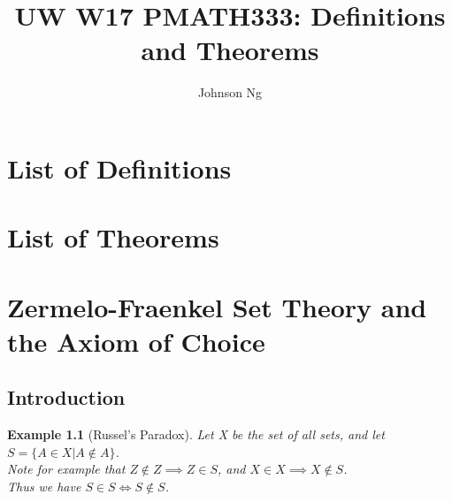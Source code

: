 \documentclass[11pt, oneside]{book}
\title{UW W17 PMATH333: Definitions and Theorems}
\author{Johnson Ng}
\theoremstyle{break}
\newtheorem{eg}{Example}[section]
\begin{document}
\maketitle
\tableofcontents

\chapter*{List of Definitions}

\chapter*{List of Theorems}

\appendix

\chapter{Zermelo-Fraenkel Set Theory and the Axiom of Choice}
\section{Introduction}
\begin{eg}[Russel's Paradox]
	Let X be the set of all sets, and let $S = \{ A \in X | A \notin A\}$.\\
	Note for example that $Z \notin Z \implies Z \in S$, and $X \in X \implies X \notin S$.\\
	Thus we have $S \in S \iff S \notin S$.
\end{eg}
\end{document}
